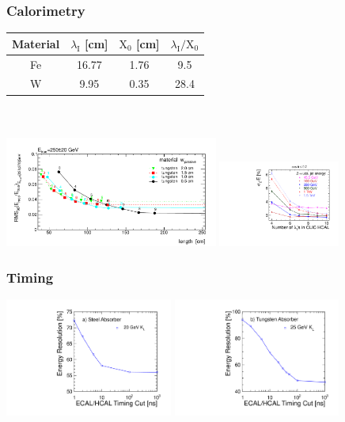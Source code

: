 \documentclass{beamer}
\begin{document}
\begin{frame}
\frametitle{Calorimetry}
\begin{center}
\begin{tabular}{cccc}\toprule
Material & $\lambda_{\textrm{I}}$ [cm] & $\textrm{X}_0$ [cm] &
$\lambda_{\textrm{I}}/\textrm{X}_0$ \\ 
\midrule Fe       & 16.77             & 1.76       & 9.5\\
W        & 9.95              & 0.35       & 28.4\\ \bottomrule
\end{tabular}\\
~\\
\includegraphics[width=7cm]{Fig81.pdf}
\includegraphics[width=4cm]{ildHcal_jetEnergyResolution_vs_hcalLambdaI.pdf}
\end{center}
\end{frame}

\begin{frame}
\frametitle{Timing}
\includegraphics[width=5.5cm]{timingKL_steel.pdf}
\includegraphics[width=5.5cm]{timingKL_tungsten.pdf}
\end{frame}
\end{document}
